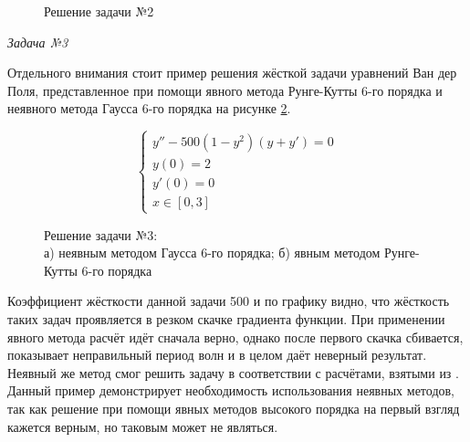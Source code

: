 \begin{figure}
    
    \caption{Решение задачи №2}
    \label{fig:task2}
\end{figure}

\textit{Задача №3}

Отдельного внимания стоит пример решения жёсткой задачи уравнений Ван дер Поля, представленное при помощи явного метода Рунге-Кутты 6-го порядка и неявного метода Гаусса 6-го порядка на рисунке \ref{fig:tough2}.

\begin{equation}
    \begin{cases}
        y'' - 500(1 - y^2)(y + y') = 0\\
        y(0) = 2\\
        y'(0) = 0\\
        x \in [0, 3]
    \end{cases}
    \label{eq:KoshiTask3}
\end{equation}

\begin{figure}
    \begin{subfigure}[t]{0.45\linewidth}
        \centering
        
        \caption{}
    \end{subfigure}
    \hfill
    \begin{subfigure}[t]{0.45\linewidth}
        \centering
        
        \caption{}
    \end{subfigure}
    \hfill
    \caption{Решение задачи №3:\\ а) неявным методом Гаусса 6-го порядка; б) явным методом Рунге-Кутты 6-го порядка}
    \label{fig:tough2}
\end{figure}

Коэффициент жёсткости данной задачи 500 и по графику видно, что жёсткость таких задач проявляется в резком скачке градиента функции.
При применении явного метода расчёт идёт сначала верно, однако после первого скачка сбивается, показывает неправильный период
волн и в целом даёт неверный результат. Неявный же
метод смог решить задачу в соответствии с расчётами, взятыми из \cite{Article8, book10}.
Данный пример демонстрирует необходимость использования неявных методов, так как решение при помощи явных методов высокого порядка
на первый взгляд кажется верным, но таковым может не являться.
